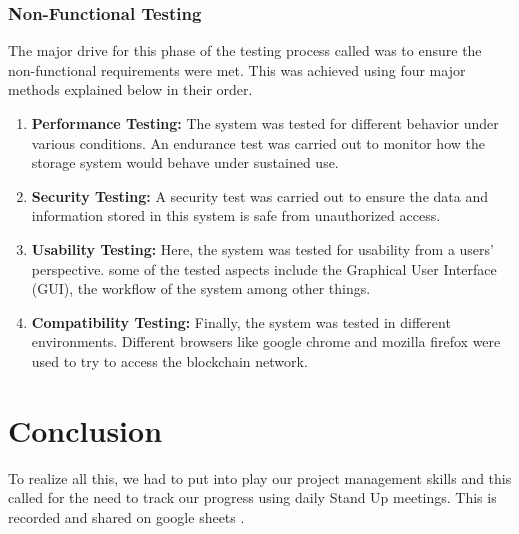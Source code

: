 \subsubsection{Non-Functional Testing}
The major drive for this phase of the testing process called was to ensure the non-functional requirements were met. This was achieved using four major methods explained below in their order.
\begin{enumerate}
\item \textbf{Performance Testing:} The system was tested for different behavior under various conditions. An endurance test was carried out to monitor how the storage system would behave under sustained use.
\item \textbf{Security Testing:} A security test was carried out to ensure the data and information stored in this system is safe from unauthorized access.
\item \textbf{Usability Testing:} Here, the system was tested for usability from a users' perspective. some of the tested aspects include the Graphical User Interface (GUI), the workflow of the system among other things.
\item \textbf{Compatibility Testing:} Finally, the system was tested in different environments. Different browsers like google chrome and mozilla firefox were used to try to access the blockchain network.
\end{enumerate}

\section{Conclusion}
To realize all this, we had to put into play our project management skills and this called for the need to track our progress using daily Stand Up meetings. This is recorded and shared on google sheets \cite{art12}.


